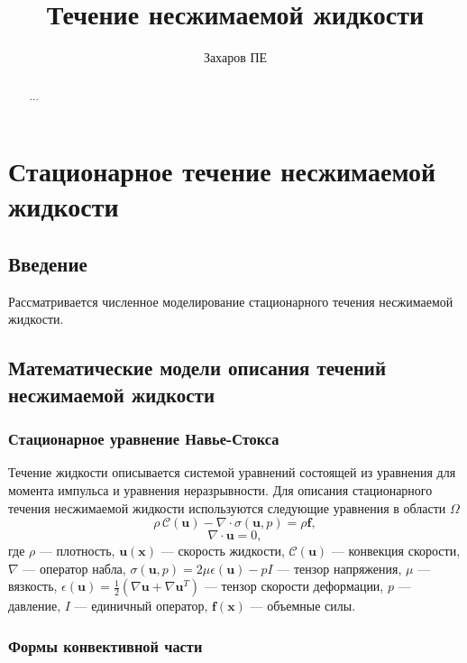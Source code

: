 \documentclass[a4paper,10pt]{report}
\title{Течение несжимаемой жидкости}
\author{Захаров ПЕ}
\begin{document}
\maketitle

\begin{abstract}
...
\end{abstract}



\chapter{Стационарное течение несжимаемой жидкости}

\section*{Введение}
Рассматривается численное моделирование стационарного течения несжимаемой жидкости. 

\section{Математические модели описания течений несжимаемой жидкости}

\subsection{Стационарное уравнение Навье-Стокса}

Течение жидкости описывается системой уравнений состоящей из уравнения для момента импульса и уравнения неразрывности. Для описания стационарного течения несжимаемой жидкости используются следующие уравнения в области $\Omega$
\begin{equation}
  \rho \,\mathcal{C}(\bm{u})
- \nabla \cdot \sigma(\bm{u}, p)
= \rho \bm{f},
\label{eq:navier-stokes}
\end{equation}
\begin{equation}
\nabla \cdot \bm{u} = 0,
\label{eq:incompressibility}
\end{equation}
где $\rho$ --- плотность, $\bm{u}(\bm{x})$ --- скорость жидкости, $\mathcal{C}(\bm{u})$ --- конвекция скорости, $\nabla$ --- оператор набла, $\sigma(\bm{u}, p)=2 \mu \epsilon(\bm{u}) - p I$ --- тензор напряжения, $\mu$ --- вязкость, $\epsilon(\bm{u}) = \frac{1}{2}\left(\nabla \bm{u} + \nabla \bm{u}^T \right)$ --- тензор скорости деформации, $p$ --- давление, $I$ --- единичный оператор, $\bm{f}(\bm{x})$ --- объемные силы.

\subsection{Формы конвективной части}
\end{document}
